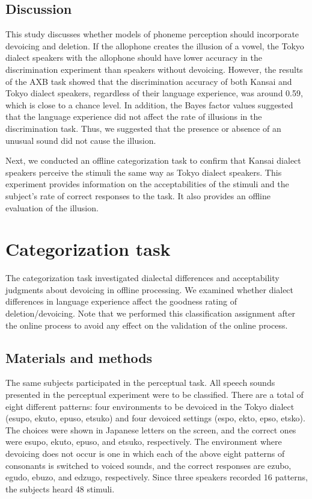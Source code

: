 \documentclass[a4paper,11pt,twocolumn]{article}
\begin{document}
\subsection{Discussion}

This study discusses whether models of phoneme perception should incorporate devoicing and deletion. If the allophone creates the illusion of a vowel, the Tokyo dialect speakers with the allophone should have lower accuracy in the discrimination experiment than speakers without devoicing. However, the results of the AXB task showed that the discrimination accuracy of both Kansai and Tokyo dialect speakers, regardless of their language experience, was around 0.59, which is close to a chance level. In addition, the Bayes factor values suggested that the language experience did not affect the rate of illusions in the discrimination task. Thus, we suggested that the presence or absence of an unusual sound did not cause the illusion.

Next, we conducted an offline categorization task to confirm that Kansai dialect speakers perceive the stimuli the same way as Tokyo dialect speakers. This experiment provides information on the acceptabilities of the stimuli and the subject's rate of correct responses to the task. It also provides an offline evaluation of the illusion.


\section{Categorization task}

The categorization task investigated dialectal differences and acceptability judgments about devoicing in offline processing. We examined whether dialect differences in language experience affect the goodness rating of deletion/devoicing. Note that we performed this classification assignment after the online process to avoid any effect on the validation of the online process.

\subsection{Materials and methods}

The same subjects participated in the perceptual task. All speech sounds presented in the perceptual experiment were to be classified. There are a total of eight different patterns: four environments to be devoiced in the Tokyo dialect (esupo, ekuto, epuso, etsuko) and four devoiced settings (espo, ekto, epso, etsko). The choices were shown in Japanese letters on the screen, and the correct ones were esupo, ekuto, epuso, and etsuko, respectively. The environment where devoicing does not occur is one in which each of the above eight patterns of consonants is switched to voiced sounds, and the correct responses are ezubo, egudo, ebuzo, and edzugo, respectively. Since three speakers recorded 16 patterns, the subjects heard 48 stimuli.
\end{document}
